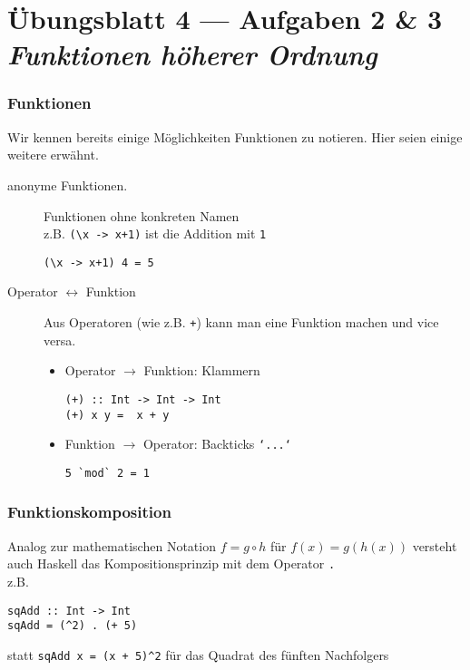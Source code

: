 \documentclass{beamer}
\begin{document}

\section{Übungsblatt 4 --- Aufgaben 2 \& 3 \\ \textit{\normalsize Funktionen höherer Ordnung}}


\begin{frame}[fragile] \frametitle{Funktionen}
	\footnotesize
	Wir kennen bereits einige Möglichkeiten Funktionen zu notieren. Hier seien einige weitere erwähnt.
	\begin{description}
		\item[anonyme Funktionen.] Funktionen ohne konkreten Namen \\
		z.B. \lstinline[basicstyle=\ttfamily\normalsize]|(\x -> x+1)| ist die Addition mit \texttt{1} 
		\begin{lstlisting}[style=bg]
(\x -> x+1) 4 = 5
		\end{lstlisting}
		\pause
		\item[Operator $\leftrightarrow$ Funktion] Aus Operatoren (wie z.B. \texttt{+}) kann man eine Funktion machen und vice versa.
		\begin{itemize}
			\item Operator $\to$ Funktion: Klammern
			\begin{lstlisting}[style=bg]
(+) :: Int -> Int -> Int
(+) x y =  x + y
			\end{lstlisting}
			\item Funktion $\to$ Operator: Backticks \texttt{`...`}
			\begin{lstlisting}[style=bg]
5 `mod` 2 = 1
			\end{lstlisting}
		\end{itemize}
	\end{description}
\end{frame}

\begin{frame}[fragile] \frametitle{Funktionskomposition}
	Analog zur mathematischen Notation $f = g \circ h$ für $f(x) = g(h(x))$ versteht auch Haskell das Kompositionsprinzip mit dem Operator \texttt{.} \\
	z.B. 
	\begin{lstlisting}[style=bg]
sqAdd :: Int -> Int
sqAdd = (^2) . (+ 5)
	\end{lstlisting} 
	statt \lstinline[basicstyle=\ttfamily\normalsize]|sqAdd x = (x + 5)^2| für das Quadrat des fünften Nachfolgers
\end{frame}
\end{document}
